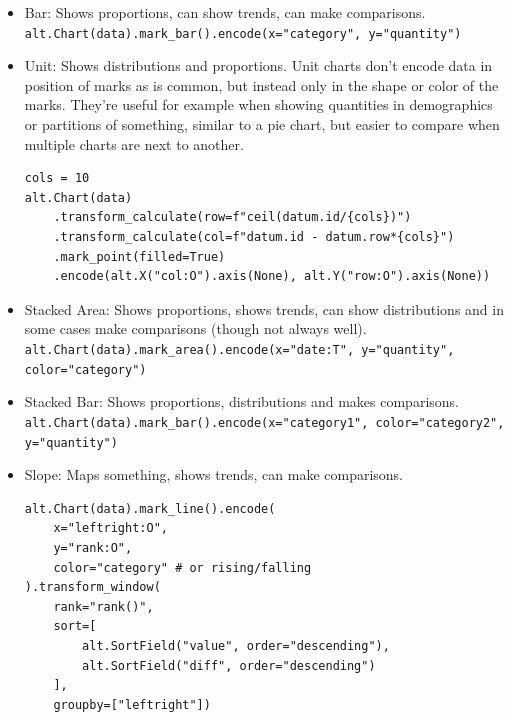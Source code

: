     \begin{exercise} \hfill

        \begin{itemize}
            \item Bar: Shows proportions, can show trends, can make comparisons. \lstinline|alt.Chart(data).mark_bar().encode(x="category", y="quantity")|
            \item Unit: Shows distributions and proportions. Unit charts don't encode data in position of marks as is common, but instead only in the shape or color of the marks. They're useful for example when showing quantities in demographics or partitions of something, similar to a pie chart, but easier to compare when multiple charts are next to another.
            
            \begin{lstlisting}
cols = 10
alt.Chart(data)
    .transform_calculate(row=f"ceil(datum.id/{cols})")
    .transform_calculate(col=f"datum.id - datum.row*{cols}")
    .mark_point(filled=True)
    .encode(alt.X("col:O").axis(None), alt.Y("row:O").axis(None))\end{lstlisting}
            
            \item Stacked Area: Shows proportions, shows trends, can show distributions and in some cases make comparisons (though not always well).
            \lstinline|alt.Chart(data).mark_area().encode(x="date:T", y="quantity", color="category")|
            
            \item Stacked Bar: Shows proportions, distributions and makes comparisons.
            \lstinline|alt.Chart(data).mark_bar().encode(x="category1", color="category2", y="quantity")|

            \item Slope: Maps something, shows trends, can make comparisons.
            \begin{lstlisting}
alt.Chart(data).mark_line().encode(
    x="leftright:O",
    y="rank:O",
    color="category" # or rising/falling
).transform_window(
    rank="rank()",
    sort=[
        alt.SortField("value", order="descending"),
        alt.SortField("diff", order="descending")
    ],
    groupby=["leftright"])\end{lstlisting}


\end{itemize}
\end{exercise}
